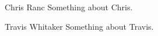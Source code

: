 \documentclass[journal]{IEEEtran}
\begin{document}
% 

\begin{IEEEbiographynophoto}{Chris Ranc}
Something about Chris.
\end{IEEEbiographynophoto}

\begin{IEEEbiographynophoto}{Travis Whitaker}
Something about Travis.
\end{IEEEbiographynophoto}
\end{document}
